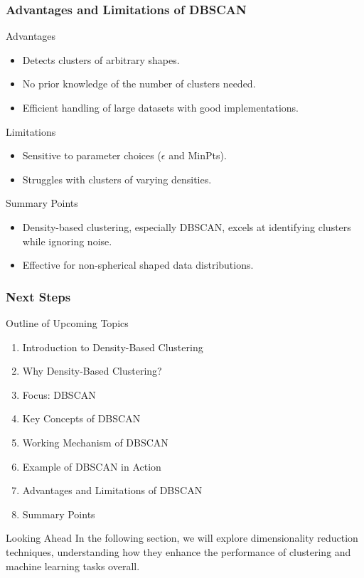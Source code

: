 \documentclass[aspectratio=169]{beamer}
\begin{document}
\begin{frame}[fragile]
    \frametitle{Advantages and Limitations of DBSCAN}
    \begin{block}{Advantages}
        \begin{itemize}
            \item Detects clusters of arbitrary shapes.
            \item No prior knowledge of the number of clusters needed.
            \item Efficient handling of large datasets with good implementations.
        \end{itemize}
    \end{block}
    
    \begin{block}{Limitations}
        \begin{itemize}
            \item Sensitive to parameter choices ($\epsilon$ and MinPts).
            \item Struggles with clusters of varying densities.
        \end{itemize}
    \end{block}

    \begin{block}{Summary Points}
        \begin{itemize}
            \item Density-based clustering, especially DBSCAN, excels at identifying clusters while ignoring noise.
            \item Effective for non-spherical shaped data distributions.
        \end{itemize}
    \end{block}
\end{frame}

\begin{frame}[fragile]
    \frametitle{Next Steps}
    \begin{block}{Outline of Upcoming Topics}
        \begin{enumerate}
            \item Introduction to Density-Based Clustering 
            \item Why Density-Based Clustering?
            \item Focus: DBSCAN
            \item Key Concepts of DBSCAN
            \item Working Mechanism of DBSCAN
            \item Example of DBSCAN in Action
            \item Advantages and Limitations of DBSCAN
            \item Summary Points
        \end{enumerate}
    \end{block}

    \begin{block}{Looking Ahead}
        In the following section, we will explore dimensionality reduction techniques, understanding how they enhance the performance of clustering and machine learning tasks overall.
    \end{block}
\end{frame}
\end{document}
